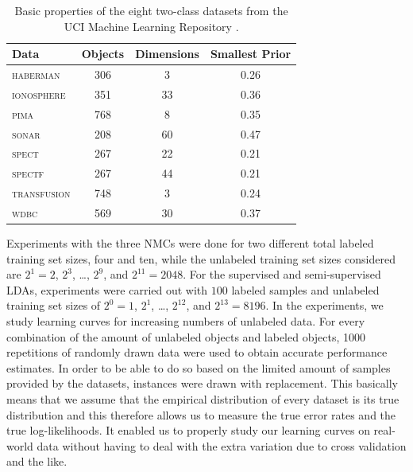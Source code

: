 \documentclass[twoside]{memoir}\usepackage[]{graphicx}\usepackage{xcolor}
\renewcommand{\cite}{\citep}
\begin{document}
\begin{table}[ht]
\begin{center}
\caption{Basic properties of the eight two-class datasets from the UCI Machine Learning Repository \cite{Lichman2013}.}\label{tab:real}
\begin{tabular}{lccc}
\toprule
Data & Objects & Dimensions & Smallest Prior\\ 
\midrule
{ \scshape haberman } & 306 & 3 & 0.26 \\
{ \scshape ionosphere } & 351 & 33 & 0.36 \\
{ \scshape pima } & 768 & 8 & 0.35 \\
{ \scshape sonar } & 208 & 60 & 0.47 \\
{ \scshape spect } & 267 & 22 & 0.21 \\
{ \scshape spectf } & 267 & 44 & 0.21 \\
{ \scshape transfusion } & 748 & 3 & 0.24 \\
{ \scshape wdbc } & 569 & 30 & 0.37 \\
\bottomrule
\end{tabular}
\end{center}
\end{table}

Experiments with the three NMCs were done for two different total labeled training set sizes, four and ten, while the unlabeled training set sizes considered are $2^1=2$, $2^3$, \dots, $2^{9}$, and $2^{11} = 2048$.  For the supervised and semi-supervised LDAs, experiments were carried out with $100$ labeled samples and unlabeled training set sizes of $2^0=1$, $2^1$, \dots, $2^{12}$, and $2^{13} = 8196$. In the experiments, we study learning curves for increasing numbers of unlabeled data.  For every combination of the amount of unlabeled objects and labeled objects, 1000 repetitions of randomly drawn data were used to obtain accurate performance estimates.  In order to be able to do so based on the limited amount of samples provided by the datasets, instances were drawn with replacement.  This basically means that we assume that the empirical distribution of every dataset is its true distribution and this therefore allows us to measure the true error rates and the true log-likelihoods. It enabled us to properly study our learning curves on real-world data without having to deal with the extra variation due to cross validation and the like.
\end{document}

